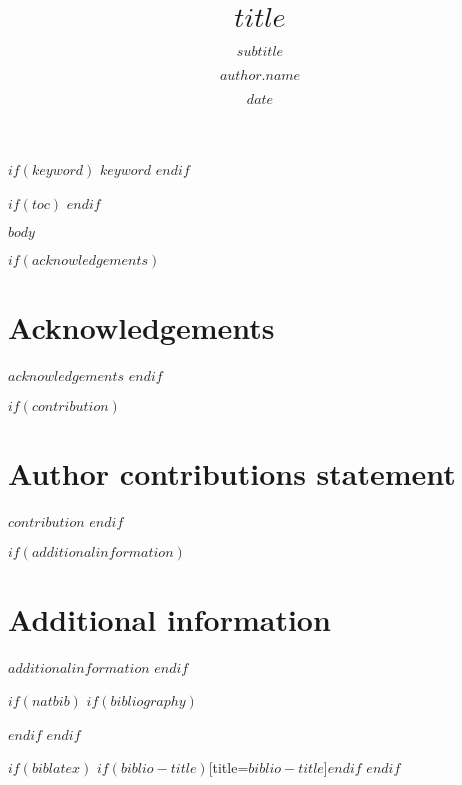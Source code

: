 \documentclass[$if(fontsize)$$fontsize$,$endif$$if(lang)$$lang$,$endif$$if(papersize)$$papersize$,$endif$$for(classoption)$$classoption$$sep$,$endfor$]{$documentclass$}
\author[$author.footnote$ $if(author.corresponding)$,$$\ast$$ $endif$]{$author.name$}
\affil[$affiliation.number$]{$affiliation.name$}
\affil[*]{$author.email$}
\date{$date$}
\title{$title$}
\subtitle{$subtitle$}
\begin{document}
\maketitle %


$if(keyword)$
$keyword$
$endif$


$if(toc)$
\setcounter{tocdepth}{$toc-depth$}
\tableofcontents
$endif$
 
  
$body$


$if(acknowledgements)$
\section*{Acknowledgements}
$acknowledgements$
$endif$

$if(contribution)$
\section*{Author contributions statement}
$contribution$
$endif$


$if(additionalinformation)$
\section*{Additional information}
$additionalinformation$
$endif$
 




 
$if(natbib)$
$if(bibliography)$
% 

$endif$
$endif$

$if(biblatex)$
\printbibliography$if(biblio-title)$[title=$biblio-title$]$endif$
$endif$






\end{document}
